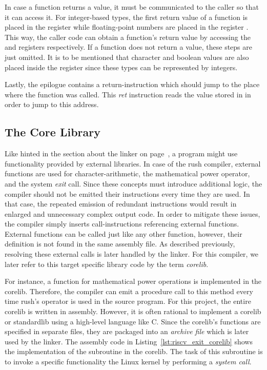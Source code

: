 In case a function returns a value, it must be communicated to the caller so that it can access it.
For integer-based types, the first return value of a function is placed in the register 
while floating-point numbers are placed in the register .
This way, the caller code can obtain a function's return value by accessing the  and 
registers respectively. If a function does not return a value, these steps are just omitted.
It is to be mentioned that character and boolean values are also placed inside the  register since these types can be represented by integers.

Lastly, the epilogue contains a return-instruction which should jump to the place where the function was called.
This \emph{ret} instruction reads the value stored in  in order to jump to this address.

\subsection{The Core Library}

Like hinted in the section about the linker on page~\pageref{sec:linker},
a program might use functionality provided by external libraries.
In case of the rush \riscv{} compiler, external functions are used for character-arithmetic,
the mathematical power operator, and the system \emph{exit} call.
Since these concepts must introduce additional logic, the compiler should not be emitted their instructions every time they are used.
In that case, the repeated emission of redundant instructions would result in enlarged and unnecessary complex output code.
In order to mitigate these issues, the compiler simply inserts call-instructions referencing external functions.
External functions can be called just like any other function, however, their definition is not found in the same assembly file.
As described previously, resolving these external calls is later handled by the linker.
For this compiler, we later refer to this target specific library code by the term \emph{corelib}.

For instance, a function for mathematical power operations is implemented in the corelib.
Therefore, the compiler can emit a procedure call to this method every time rush's \qVerb{**} operator is used in the source program.
For this project, the entire corelib is written in \riscv{} assembly.
However, it is often rational to implement a corelib or standardlib using a high-level language like C.
Since the corelib's functions are specified in separate files, they are packaged into an \emph{archive file} which is later used by the linker.
The assembly code in Listing~\ref{lst:riscv_exit_corelib} shows the implementation of the  subroutine in the \riscv{} corelib.
The task of this subroutine is to invoke a specific functionality the Linux kernel by performing a \emph{system call}.

